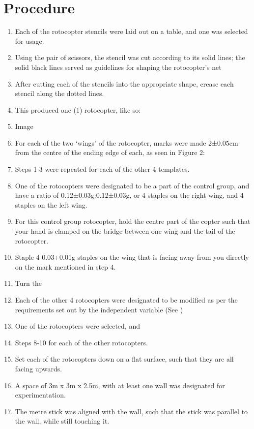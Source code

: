 \documentclass[]{article}
\begin{document}
\section{Procedure}
\begin{enumerate}
    \item Each of the rotocopter stencils were laid out on a table, and one was selected for usage.
    \item Using the pair of scissors, the stencil was cut according to its solid lines; the solid black lines served as guidelines for shaping the rotocopter’s net
    \item After cutting each of the stencils into the appropriate shape, crease each stencil along the dotted lines.
    \item This produced one (1) rotocopter, like so:
    \item Image
    \item For each of the two ‘wings’ of the rotocopter, marks were made 2±0.05cm from the centre of the ending edge of each, as seen in Figure 2:
    \item Steps 1-3 were repeated for each of the other 4 templates.
    \item One of the rotocopters were designated to be a part of the control group, and have a ratio of 0.12±0.03g:0.12±0.03g, or 4 staples on the right wing, and 4 staples on the left wing.
    \item For this control group rotocopter, hold the centre part of the copter such that your hand is clamped on the bridge between one wing and the tail of the rotocopter.
    \item Staple 4 0.03$\pm$0.01g staples on the wing that is facing away from you directly on the mark mentioned in step 4.
    \item Turn the 
    \item Each of the other 4 rotocopters were designated to be modified as per the requirements set out by the independent variable (See )
    \item One of the rotocopters were selected, and 
    \item Steps 8-10 for each of the other rotocopters.
    \item Set each of the rotocopters down on a flat surface, such that they are all facing upwards.
    \item A space of 3m x 3m x 2.5m, with at least one wall was designated for experimentation.
    \item The metre stick was aligned with the wall, such that the stick was parallel to the wall, while still touching it.

\end{enumerate}
\end{document}
